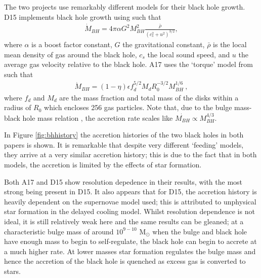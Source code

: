 The two projects use remarkably different models for their black hole growth.
D15 implements black hole growth using \citet{bondi_spherically_1952} such
that
\begin{align}
  \dot{M}_{BH} = 4\pi \alpha G^2 M_{BH}^2
                 \frac{\bar{\rho}}{(c_s^2 + u^2)^{3/2}},
  \label{eqn:d15:mdot}
\end{align}
where $\alpha$ is a boost factor constant, $G$ the gravitational constant,
$\bar{\rho}$ is the local mean density of gas around the black hole, $c_s$ the
local sound speed, and $u$ the average gas velocity relative to the black hole.
A17 uses the `torque' model from \citet{hopkins_analytic_2011} such that
\begin{align}
  \dot{M}_{BH} = (1 - \eta) \epsilon f_d^{5/2} M_d R_0^{-3/2} M_{BH}^{1/6}~,
  \label{eqn:a17:mdot}
\end{align}
where $f_d$ and $M_d$ are the mass fraction and total mass of the disks within
a radius of $R_0$ which encloses 256 gas particles.
Note that, due to the bulge mass-black hole mass relation
\citep{haring_black_2004}, the accretion rate scales like
$\dot{M_{BH}} \propto M_{BH}^{4/3}$.

In Figure \ref{fig:bhhistory} the accretion histories of the two black holes
in both papers is shown. It is remarkable that despite very different `feeding'
models, they arrive at a very similar accretion history; this is due to the
fact that in both models, the accretion is limited by the effects of star
formation.

Both A17 and D15 show resolution depedence in their results, with the most
strong being present in D15. It also appears that for D15, the accretion
history is heavily dependent on the supernovae model used; this is attributed
to unphysical star formation in the delayed cooling model. Whilst resolution
dependence is not ideal, it is still relatively weak here and the same results
can be gleaned; at a characteristic bulge mass of around $10^{9-10}$ M$_\odot$
when the bulge and black hole have enough mass to begin to self-regulate, the
black hole can begin to accrete at a much higher rate. At lower masses star
formation regulates the bulge mass and hence the accretion of the black hole is
quenched as excess gas is converted to stars.
